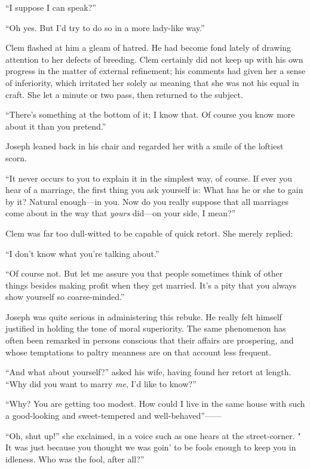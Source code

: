 ``I suppose I can speak?''

``Oh yes. But I'd try to do so in a more lady-like way.''

Clem flashed at him a gleam of hatred. He had become fond lately of
drawing attention to her defects of breeding. Clem certainly did not
keep up with his own progress in the matter of external refinement; his
comments had given her a sense of inferiority, which irritated her
solely as meaning that she was not his equal in craft. She let a minute
or two pass, then returned to the subject.

``There's something at the bottom of it; I
{\protect\hypertarget{158}{}{}}know that. Of course you know more about
it than you pretend.''

Joseph leaned back in his chair and regarded her with a smile of the
loftiest scorn.

``It never occurs to you to explain it in the simplest way, of course.
If ever you hear of a marriage, the first thing you ask yourself is:
What has he or she to gain by it? Natural enough---in you. Now do you
really suppose that all marriages come about in the way that
\emph{yours} did---on your side, I mean?''

Clem was far too dull-witted to be capable of quick retort. She merely
replied:

``I don't know what you're talking about.''

``Of course not. But let me assure you that people sometimes think of
other things besides making profit when they get married. It's a pity
that you always show yourself so coarse-minded.''

Joseph was quite serious in administering this rebuke. He really felt
himself justified in holding the tone of moral superiority. The same
phenomenon has often been remarked in persons conscious that their
affairs are prospering, and whose temptations to paltry meanness are on
that account less frequent.

{\protect\hypertarget{159}{}{}}``And what about yourself?'' asked his
wife, having found her retort at length. ``Why did you want to marry
\emph{me}, I'd like to know?''

``Why? You are getting too modest. How could I live in the same house
with such a good-looking and sweet-tempered and well-behaved''{{------}}

``Oh, shut up!'' she exclaimed, in a voice such as one hears at the
street-corner. " It was just because you thought we was goin' to be
fools enough to keep you in idleness. Who was the fool, after all?''

